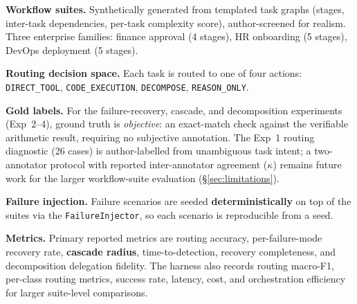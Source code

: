\documentclass[sigconf,nonacm,anonymous]{acmart}  %
\begin{document}
\textbf{Workflow suites.} Synthetically generated from templated task graphs
(stages, inter-task dependencies, per-task complexity score),
author-screened for realism. Three enterprise families: finance approval
(4 stages), HR onboarding (5 stages), DevOps deployment (5 stages).

\textbf{Routing decision space.} Each task is routed to one of four actions:
\texttt{DIRECT\_TOOL}, \texttt{CODE\_EXECUTION}, \texttt{DECOMPOSE},
\texttt{REASON\_ONLY}.

\textbf{Gold labels.} For the failure-recovery, cascade, and decomposition
experiments (Exp~2--4), ground truth is \emph{objective}: an exact-match check
against the verifiable arithmetic result, requiring no subjective annotation.
The Exp~1 routing diagnostic (26 cases) is author-labelled from unambiguous task
intent; a two-annotator protocol with reported inter-annotator agreement
($\kappa$) remains future work for the larger workflow-suite evaluation
(\S\ref{sec:limitations}).

\textbf{Failure injection.} Failure scenarios are seeded \textbf{deterministically}
on top of the suites via the \texttt{FailureInjector}, so each scenario is
reproducible from a seed.

\textbf{Metrics.} Primary reported metrics are routing accuracy,
per-failure-mode recovery rate, \textbf{cascade radius}, time-to-detection,
recovery completeness, and decomposition delegation fidelity. The harness also
records routing macro-F1, per-class routing metrics, success rate, latency, cost,
and orchestration efficiency for larger suite-level comparisons.
\end{document}
